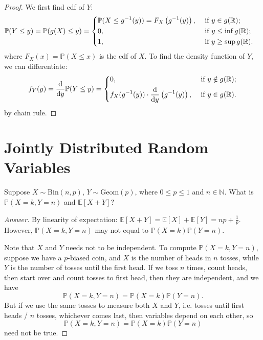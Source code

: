 \begin{proof}
    We first find cdf of \(Y\):
    \begin{align*}
        \mathbb{P} (Y \le y) &= \mathbb{P} (g(X) \le y) = \begin{dcases}
            \mathbb{P} (X \le g^{-1}(y)) = F_X \left( g^{-1}(y) \right) , &\text{ if } y \in g(\mathbb{R}) ;\\
            0, &\text{ if } y \le \inf g(\mathbb{R}) ;\\
            1, &\text{ if } y \ge \sup g(\mathbb{R}).
        \end{dcases}
    \end{align*} 
    where \(F_X(x) = \mathbb{P} (X \le x)\) is the cdf of \(X\). To find the density function of \(Y\), we can differentiate:
    \[
        f_Y(y) = \frac{\mathrm{d}}{\mathrm{d}y} \mathbb{P} (Y \le y) = \begin{dcases}
            0, &\text{ if } y \notin g(\mathbb{R}) ;\\
            f_X(g^{-1} (y)) \cdot \frac{\mathrm{d}}{\mathrm{d}y} \left( g^{-1}(y) \right)  , &\text{ if } y \in g(\mathbb{R}).
        \end{dcases} 
    \]  
    by chain rule.
\end{proof}

\chapter{Jointly Distributed Random Variables}
\begin{eg}
    Suppose \(X \sim \mathrm{Bin}(n, p)\), \(Y \sim \mathrm{Geom}(p) \), where \(0 \le p \le 1\) and \(n \in \mathbb{N} \). What is \(\mathbb{P} (X = k, Y = n)\) and \(\mathbb{E} [X + Y]\)?      
\end{eg}

\begin{proof}[Answer]
    By linearity of expectation: \(\mathbb{E} [X + Y] = \mathbb{E} [X] + \mathbb{E} [Y] = np + \frac{1}{p}\). However, \(\mathbb{P} (X = k, Y = n)\) may not equal to \(\mathbb{P} (X = k) \mathbb{P} (Y = n)\). 

    Note that \(X\) and \(Y\) needs not to be independent. To compute \(\mathbb{P} (X = k, Y = n)\), suppose we have a \(p\)-biased coin, and \(X\) is the number of heads in \(n\) tosses, while \(Y\) is the number of tosses until the first head. If we toss \(n\) times, count heads, then start over and count tosses to first head, then they are independent, and we have 
    \[
        \mathbb{P} (X = k, Y = n) = \mathbb{P} (X = k) \mathbb{P} (Y = n).
    \]        
    But if we use the same tosses to measure both \(X\) and \(Y\), i.e. tosses until first heads / \(n\) tosses, whichever comes last, then variables depend on each other, so 
    \[
       \mathbb{P} (X = k, Y = n) = \mathbb{P} (X = k) \mathbb{P} (Y = n) 
    \]
    need not be true.
\end{proof}

